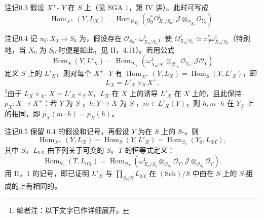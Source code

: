 \begin{SGAresult}{注记}{0.3}
假设 $X^+$- $Y$ 在 $S$ 上（见 SGA 1，第 IV 讲）。此时可写成
\[\operatorname{Hom}_{X^+}(Y,L_X)=\operatorname{Hom}_{\mathcal O_{Y_0}}(g_0^*\Omega^1_{X_0/S_0},\mathcal J\otimes_{\mathcal O_{S_0}}\mathcal O_{Y_0}).\]
\end{SGAresult}
\begin{SGAresult}{注记}{0.4}
记 $\pi_0:X_0\to S_0$ 为，假设存在 $\mathcal O_{S_0}$- $\omega^1_{X_0/S_0}$，使 $\Omega^1_{X_0/S_0}\simeq\pi_0^*\omega^1_{X_0/S_0}$（特别地，当 $X_0$ 为 $S_0$-时便是如此，见 II，4.11）。若用公式
\[\operatorname{Hom}_S(Y,L'_X)=\operatorname{Hom}_{\mathcal O_{Y_0}}(\omega^1_{X_0/S_0}\otimes_{\mathcal O_{S_0}}\mathcal O_{Y_0},\mathcal J\mathcal O_Y)\tag{0.4.1}\]
定义 $S$ 上的 $L'_X$，则对每个 $X^+$- $Y$ 有 $\operatorname{Hom}_{X^+}(Y,L_X)=\operatorname{Hom}_S(Y,L'_X)$，即
\[L_X=L'_X\times_S X^+.\]
\footnote{编者注：以下文字已作详细展开。}由于 $L_X\times_{X^+}X=L'_X\times_S X$，$L_X$ 在 $X$ 上的诱导 $L'_X$ 在 $X$ 上的，且此保持 $p_X:X\to X^+$：若 $Y$ 为 $S$-，$h:Y\to X$ 为 $S$-，$m\in L'_X(Y)$，则 $h,m\cdot h$ 在 $Y_{\mathcal J}$ 上的相同，即 $p_X(m\cdot h)=p_X(h)$。
\end{SGAresult}
\begin{SGAresult}{注记}{0.5}
保留 0.4 的假设和记号，再假设 $Y$ 为在 $S$ 上的 $S$-。则
\[\operatorname{Hom}_{X^+}(Y,L_X)=\operatorname{Hom}_S(Y,L'_X)=\operatorname{Hom}_{S_0}(Y_0,L_{0X}),\]
其中 $S_0$- $L_{0X}$ 由下列关于可变的 $S_0$- $T$ 的恒等式定义：
\[\operatorname{Hom}_{S_0}(T,L_{0X})=\operatorname{Hom}_{\mathcal O_T}(\omega^1_{X_0/S_0}\otimes_{\mathcal O_{S_0}}\mathcal O_T,\mathcal J\otimes_{\mathcal O_{S_0}}\mathcal O_T).\tag{0.5.1}\]
用 II，1 的记号，即已证明 $L'_X$ 与 $\prod_{S_0/S}L_{0X}$ 在 $(\mathrm{Sch})/S$ 中由在 $S$ 上的 $S$-组成的上有相同的。
\end{SGAresult}
